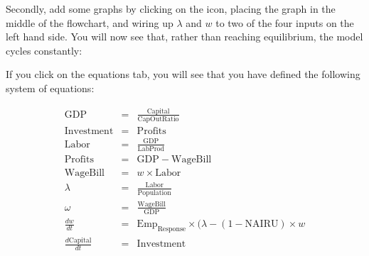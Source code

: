 Secondly, add some graphs by clicking on the 
icon, placing the graph in the middle of the flowchart, and wiring
up $\lambda$ and $w$ to two of the four inputs on the left hand
side. You will now see that, rather than reaching equilibrium, the
model cycles constantly:
\begin{center}
\par\end{center}

If you click on the equations tab, you will see that you have defined
the following system of equations:

\begin{eqnarray*}
\mathrm{GDP} & = & \frac{\mathrm{Capital}}{\mathrm{CapOutRatio}}\\
\mathrm{Investment} & = & \mathrm{Profits}\\
\mathrm{Labor} & = & \frac{\mathrm{GDP}}{\mathrm{LabProd}}\\
\mathrm{Profits} & = & \mathrm{GDP}-\mathrm{WageBill}\\
\mathrm{WageBill} & = & w\times\mathrm{Labor}\\
\lambda & = & \frac{\mathrm{Labor}}{\mathrm{Population}}\\
\omega & = & \frac{\mathrm{WageBill}}{\mathrm{GDP}}\\
\frac{dw}{dt} & = & \mathrm{Emp}_{\mathrm{Response}}\times(\lambda-(1-\mathrm{NAIRU})\times w\\
\frac{d\mathrm{Capital}}{dt} & = & \mathrm{Investment}\\
\end{eqnarray*}

